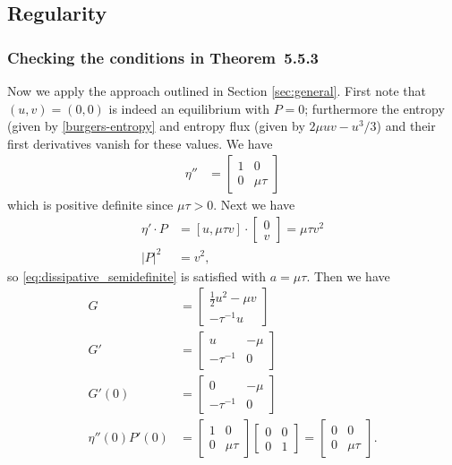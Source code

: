 \documentclass{article}
\theoremstyle{plain}
\theoremstyle{definition}
\numberwithin{theorem}{section}
\begin{document}
\subsection{Regularity}

\subsubsection{Checking the conditions in Theorem~5.5.3}
Now we apply the approach outlined in Section \ref{sec:general}.
First note that $(u,v) = (0,0)$ is indeed an equilibrium with $P=0$;
furthermore the entropy (given by \eqref{burgers-entropy} and entropy flux
(given by $2\mu uv - u^3/3$) and their first derivatives vanish for these values.
We have
\begin{align}
    \eta'' & = \begin{bmatrix}
        1 & 0 \\ 0 & \mu \tau
    \end{bmatrix}
\end{align}
which is positive definite since $\mu \tau >0$.
Next we have
\begin{align}
    \eta' \cdot P & = [u, \mu \tau v] \cdot  \begin{bmatrix} 0 \\ v \end{bmatrix} = \mu \tau v^2 \\
    |P|^2 & = v^2,
\end{align}
so \eqref{eq:dissipative_semidefinite} is satisfied with $a = \mu \tau$.
Then we have
\begin{align}
    G & = \begin{bmatrix} \frac{1}{2} u^2 -\mu v \\ -\tau^{-1} u \end{bmatrix} \\
   G' & = \begin{bmatrix} u & -\mu \\ -\tau^{-1} &  0 \end{bmatrix} \\
   G'(0) & = \begin{bmatrix} 0 & -\mu \\ -\tau^{-1} &  0 \end{bmatrix} \\
   \eta''(0) P'(0) & = \begin{bmatrix} 1 & 0 \\ 0 & \mu \tau \end{bmatrix}
    \begin{bmatrix} 0 & 0 \\ 0 & 1 \end{bmatrix} =
    \begin{bmatrix} 0 & 0 \\ 0 & \mu \tau \end{bmatrix}.
\end{align}
\end{document}
